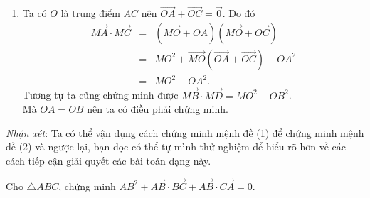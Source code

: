\begin{vd}
{\begin{enumerate}
\begin{eqnarray*}
				      & = & MB^2+MD^2+2\overrightarrow{BA}\left(\overrightarrow{BA}+\overrightarrow{DB}\right)\\
				      & = & MB^2+MD^2+2\overrightarrow{BA}\cdot\overrightarrow{DA}=MB^2+MD^2.
			      \end{eqnarray*}
			\item Ta có $O$ là trung điểm $AC$ nên $\overrightarrow{OA}+\overrightarrow{OC}=\overrightarrow{0}$. Do đó
			      \begin{eqnarray*}
				      \overrightarrow{MA}\cdot\overrightarrow{MC} & = & \left(\overrightarrow{MO}+\overrightarrow{OA}\right)\left(\overrightarrow{MO}+\overrightarrow{OC}\right)\\
				      & = & MO^2+\overrightarrow{MO}\left(\overrightarrow{OA}+\overrightarrow{OC}\right)-OA^2\\
				      & = & MO^2-OA^2.
			      \end{eqnarray*}
			      Tương tự ta cũng chứng minh được $\overrightarrow{MB}\cdot\overrightarrow{MD}=MO^2-OB^2$.\\
			      Mà $OA=OB$ nên ta có điều phải chứng minh.
		\end{enumerate}
		\textit{Nhận xét}: Ta có thể vận dụng cách chứng minh mệnh đề (1) để chứng minh mệnh đề (2) và ngược lại, bạn đọc có thể tự mình thử nghiệm để hiểu rõ hơn về các cách tiếp cận giải quyết các bài toán dạng này.
	}
\end{vd}
\baitaptl
\begin{bt}%
	Cho $\triangle ABC$, chứng minh
	$AB^2+\overrightarrow{AB}\cdot\overrightarrow{BC}+\overrightarrow{AB}\cdot\overrightarrow{CA}=0$.
\end{bt}

